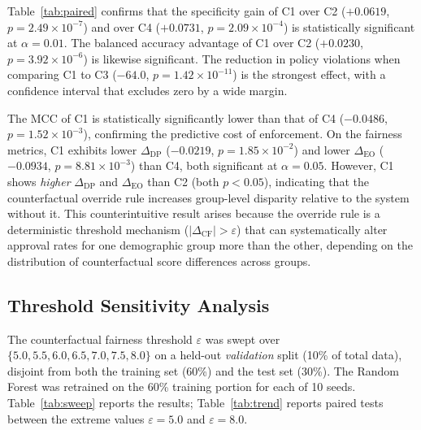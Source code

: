 Table~\ref{tab:paired} confirms that the specificity gain of C1 over C2
($+0.0619$, $p = 2.49 \times 10^{-7}$) and over C4 ($+0.0731$,
$p = 2.09 \times 10^{-4}$) is statistically significant at $\alpha = 0.01$.
The balanced accuracy advantage of C1 over C2 ($+0.0230$,
$p = 3.92 \times 10^{-6}$) is likewise significant. The reduction in policy
violations when comparing C1 to C3 ($-64.0$, $p = 1.42 \times 10^{-11}$) is
the strongest effect, with a confidence interval that excludes zero by a
wide margin.

The MCC of C1 is statistically significantly lower than that of C4
($-0.0486$, $p = 1.52 \times 10^{-3}$), confirming the predictive cost of
enforcement. On the fairness metrics, C1 exhibits lower $\Delta_{\text{DP}}$
($-0.0219$, $p = 1.85 \times 10^{-2}$) and lower $\Delta_{\text{EO}}$
($-0.0934$, $p = 8.81 \times 10^{-3}$) than C4, both significant at
$\alpha = 0.05$. However, C1 shows \emph{higher} $\Delta_{\text{DP}}$ and
$\Delta_{\text{EO}}$ than C2 (both $p < 0.05$), indicating that the
counterfactual override rule increases group-level disparity relative to
the system without it. This counterintuitive result arises because the
override rule is a deterministic threshold mechanism ($|\Delta_{\text{CF}}|
> \varepsilon$) that can systematically alter approval rates for one
demographic group more than the other, depending on the distribution of
counterfactual score differences across groups.

\subsection{Threshold Sensitivity Analysis}

The counterfactual fairness threshold $\varepsilon$ was swept over
$\{5.0, 5.5, 6.0, 6.5, 7.0, 7.5, 8.0\}$ on a held-out \emph{validation}
split (10\% of total data), disjoint from both the training set (60\%) and
the test set (30\%). The Random Forest was retrained on the 60\% training
portion for each of 10 seeds. Table~\ref{tab:sweep} reports the results;
Table~\ref{tab:trend} reports paired tests between the extreme values
$\varepsilon = 5.0$ and $\varepsilon = 8.0$.

